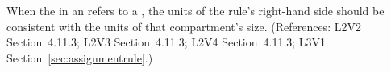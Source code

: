When the  in an \AssignmentRule refers to a \Compartment,
the units of the rule's right-hand side should be consistent with the units
of that compartment's size.  (References: L2V2 Section~4.11.3;
L2V3 Section~4.11.3; L2V4 Section~4.11.3; L3V1 Section~\ref{sec:assignmentrule}.)
